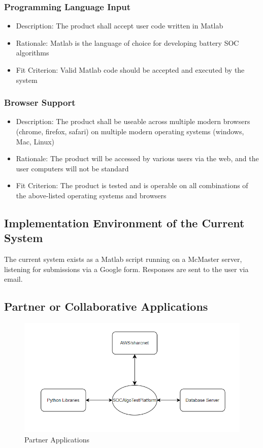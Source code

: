 \documentclass[12pt]{article}
\begin{document}
\subsubsection{Programming Language Input}
    \begin{itemize}
        \item Description: The product shall accept user code written in Matlab
        \item Rationale: Matlab is the language of choice for developing battery SOC algorithms
        \item Fit Criterion: Valid Matlab code should be accepted and executed by the system
    \end{itemize}
    \subsubsection{Browser Support}
    \begin{itemize}
        \item Description: The product shall be useable across multiple modern browsers (chrome, firefox, safari) on multiple modern operating systems (windows, Mac, Linux)
        \item Rationale: The product will be accessed by various users via the web, and the user computers will not be standard
        \item Fit Criterion: The product is tested and is operable on all combinations of the above-listed operating systems and browsers
    \end{itemize}
\subsection{Implementation Environment of the Current System}
The current system exists as a Matlab script running on a McMaster server, listening for submissions via a Google form. Responses are sent to the user via email. 
\subsection{Partner or Collaborative Applications}
\begin{figure}[H]
    \centering
    \includegraphics[width=1\linewidth]{diagrams/partner_applications.png}
    \caption{Partner Applications}
    \label{fig:Partner Applications}
\end{figure}
\end{document}
